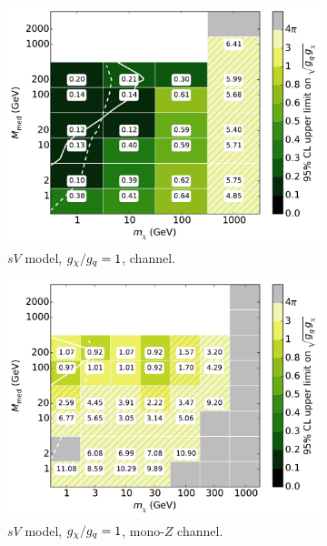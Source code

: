 \begin{figure}
  \centering
  \begin{subfigure}[t]{0.32\textwidth}
    \centering
    \includegraphics[width=1.\textwidth]{figures/grid_basepoints_SVD_rat1_monojet.pdf}
    \caption{$sV$ model, $g_{\chi}/g_q = 1$, \monojet channel.}
  \end{subfigure}
  \begin{subfigure}[t]{0.32\textwidth}
    \centering
    \includegraphics[width=1.\textwidth]{figures/grid_allpoints_SVD_rat1.pdf}
    \caption{$sV$ model, $g_{\chi}/g_q = 1$, mono-$Z$ channel.}
  \end{subfigure}
  \begin{subfigure}[t]{0.32\textwidth}

\end{subfigure}
\end{figure}
